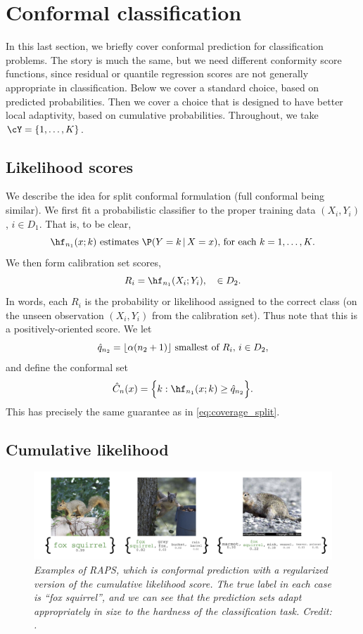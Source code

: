 \documentclass{article}
\begin{document}
\section{Conformal classification}

In this last section, we briefly cover conformal prediction for classification
problems. The story is much the same, but we need different conformity score
functions, since residual or quantile regression scores are not generally
appropriate in classification. Below we cover a standard choice, based on
predicted probabilities. Then we cover a choice that is designed to have better
local adaptivity, based on cumulative probabilities. Throughout, we take $\cY = 
\{1,\dots,K\}$.      

\subsection{Likelihood scores}

We describe the idea for split conformal formulation (full conformal being
similar). We first fit a probabilistic classifier  to the
proper training  data $(X_i,Y_i)$, $i \in D_1$. That is, to be clear, 
\[
\text{$\hf_{n_1}(x; k)$ estimates $\P(Y=k \,|\, X=x)$, for each
  $k=1,\ldots,K$}. 
\]
We then form calibration set scores,
\[
R_i = \hf_{n_1}(X_i; Y_i), \quad \in D_2.
\]
In words, each $R_i$ is the probability or likelihood assigned to the correct
class (on the unseen observation $(X_i,Y_i)$ from the calibration set). Thus
note that this is a positively-oriented score. We let
\[
\text{$\hat{q}_{n_2} = \lfloor \alpha (n_2+1) \rfloor$ smallest of $R_i$, $i \in
  D_2$},  
\]
and define the conformal set
\[
\hC_n(x) = \Big\{ k : \hf_{n_1}(x; k) \geq \hq_{n_2} \Big\}.
\]
This has precisely the same guarantee as in \eqref{eq:coverage_split}.

\subsection{Cumulative likelihood}

\begin{figure}[tb]
\centering
\includegraphics[width=\textwidth]{raps.png}
\caption{\it Examples of RAPS, which is conformal prediction with a regularized
  version of the cumulative likelihood score. The true label in each case is
  ``fox squirrel'', and we can see that the prediction sets adapt appropriately
  in size to the hardness of the classification task. Credit:
  \citet{angelopoulos2021uncertainty}.} 
\label{fig:raps}
\end{figure}
\end{document}
